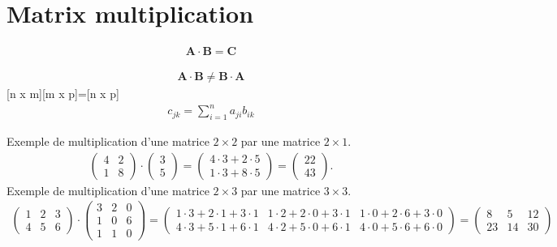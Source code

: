\section{Matrix multiplication}
\begin{eqnarray}
	\mathbf{A}\cdot \mathbf{B}=\mathbf{C} 
\end{eqnarray}

\begin{eqnarray}
	\mathbf{A}\cdot \mathbf{B}\neq\mathbf{B}\cdot \mathbf{A}
\end{eqnarray}
[n x m][m x p]=[n x p]
\begin{eqnarray}
	c_{jk}=\sum_{i=1}^na_{ji}b_{ik}
\end{eqnarray}
\begin{myExample}
	Exemple de multiplication d'une matrice $2\times2$ par une matrice $2\times1$.
	\begin{eqnarray*}
		\begin{pmatrix}
			4 & 2 \\ 1 & 8
		\end{pmatrix}
		\cdot
		\begin{pmatrix}
			3\\5
		\end{pmatrix}
		=
		\begin{pmatrix}
			4\cdot3+2\cdot5 \\ 1\cdot3+8\cdot5
		\end{pmatrix}
		=\begin{pmatrix}
			22\\43
		\end{pmatrix}.
	\end{eqnarray*}
	Exemple de multiplication d'une matrice $2\times3$ par une matrice $3\times3$.
	\begin{eqnarray*}
		\begin{pmatrix}
			1 & 2 & 3
			\\
			4 & 5 & 6
		\end{pmatrix}
		\cdot
		\begin{pmatrix}
			3 & 2 & 0
			\\
			1 & 0 & 6
			\\
			1 & 1 & 0
		\end{pmatrix}
		=\begin{pmatrix}
			1\cdot3+2\cdot1+3\cdot1 & 1\cdot2+2\cdot0+3\cdot1 & 1\cdot0+2\cdot6+3\cdot0
			\\
			4\cdot3+5\cdot1+6\cdot1 & 4\cdot2+5\cdot0+6\cdot1 & 4\cdot0+5\cdot6+6\cdot0
		\end{pmatrix}
		=\begin{pmatrix}
			8 & 5 & 12
			\\
			23 & 14 & 30
		\end{pmatrix}
	\end{eqnarray*}
\end{myExample}

